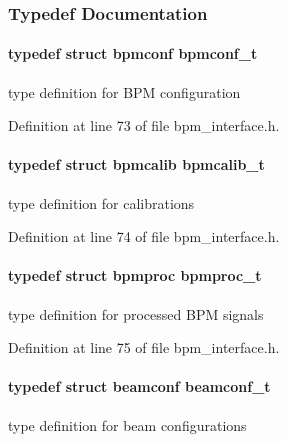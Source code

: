 \subsubsection{Typedef Documentation}
\paragraph[bpmconf\_\-t]{\setlength{\rightskip}{0pt plus 5cm}typedef struct {\bf bpmconf} {\bf bpmconf\_\-t}}\hfill\label{group__interface_gd978e4445304753f9f98b992f41b1c44}


type definition for BPM configuration 

Definition at line 73 of file bpm\_\-interface.h.
\paragraph[bpmcalib\_\-t]{\setlength{\rightskip}{0pt plus 5cm}typedef struct {\bf bpmcalib} {\bf bpmcalib\_\-t}}\hfill\label{group__interface_g84da34a9541ebd03c2f0be2f906910fe}


type definition for calibrations 

Definition at line 74 of file bpm\_\-interface.h.
\paragraph[bpmproc\_\-t]{\setlength{\rightskip}{0pt plus 5cm}typedef struct {\bf bpmproc} {\bf bpmproc\_\-t}}\hfill\label{group__interface_gf9156d432cf34176fe171bebecb99a2a}


type definition for processed BPM signals 

Definition at line 75 of file bpm\_\-interface.h.
\paragraph[beamconf\_\-t]{\setlength{\rightskip}{0pt plus 5cm}typedef struct {\bf beamconf} {\bf beamconf\_\-t}}\hfill\label{group__interface_g48d597d53219af7af0d083dad3e8842f}


type definition for beam configurations 

